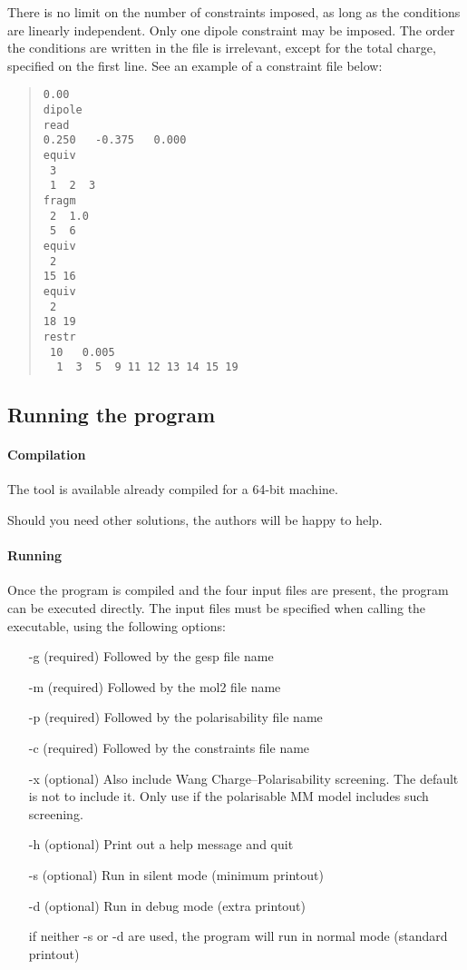 \documentclass[a4paper]{report}
\begin{document}
There is no limit on the number of constraints imposed, as long as the conditions are
linearly independent. Only one dipole constraint may be imposed. The order the
conditions are written in the file is irrelevant, except for the total charge,
specified on the first line. See an example of a constraint file below:
\begin{framed}
\begin{quote}
\begin{verbatim}
0.00
dipole
read
0.250   -0.375   0.000
equiv
 3
 1  2  3
fragm
 2  1.0
 5  6
equiv
 2
15 16
equiv
 2
18 19
restr
 10   0.005
  1  3  5  9 11 12 13 14 15 19
\end{verbatim}
\end{quote}
\end{framed}

\subsection*{Running the program}

\paragraph*{Compilation}

The tool is available already compiled for a 64-bit machine.

Should you need other solutions, the authors will be happy to help.

\paragraph*{Running}

Once the program is compiled and the four input files are present, the program can
be executed directly. The input files must be specified when calling the executable,
using the following options:
\begin{itemize}
\item[-g] (required) Followed by the gesp file name
\item[-m] (required) Followed by the mol2 file name
\item[-p] (required) Followed by the polarisability file name
\item[-c] (required) Followed by the constraints file name
\item[-x] (optional) Also include Wang Charge--Polarisability screening. The default is not to include it. Only use if the polarisable MM model includes such screening.
\item[-h] (optional) Print out a help message and quit
\item[-s] (optional) Run in silent mode (minimum printout)
\item[-d] (optional) Run in debug mode (extra printout)
\item[] if neither -s or -d are used, the program will run in normal mode (standard
printout)
\end{itemize}
\end{document}
